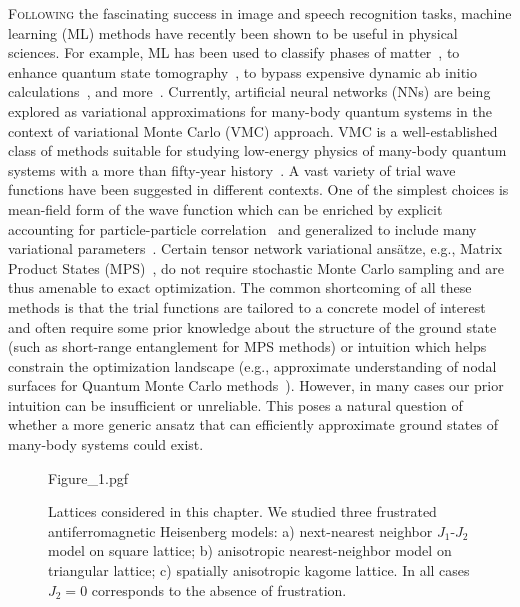\lettrine[lines=3]{F}{ollowing} the fascinating success in image and speech recognition tasks, machine learning (ML) methods have recently been shown to be useful in physical sciences. For example, ML has been used to classify phases of matter~\cite{carrasquilla2017machine}, to enhance quantum state tomography~\cite{torlai2018neural,sehayek2019learnability}, to bypass expensive dynamic ab initio calculations~\cite{brockherde2017bypassing}, and more~\cite{carleo2019machine}. Currently, artificial neural networks (NNs) are being explored as variational approximations for many-body quantum systems in the context of variational Monte Carlo (VMC) approach. VMC is a well-established class of methods suitable for studying low-energy physics of many-body quantum systems with a more than fifty-year history~\cite{McMillan}. A vast variety of trial wave functions have been suggested in different contexts. One of the simplest choices is mean-field form of the wave function which can be enriched by explicit accounting for particle-particle correlation~\cite{gros1988superconductivity,giamarchi1991phase,dev1992jastrow} and generalized to include many variational parameters~\cite{umrigar2005energy,schautz2004optimized,harju1997stochastic,capello2005variational}. Certain tensor network variational ans\"atze, e.g., Matrix Product States (MPS)~\cite{verstraete2006matrix}, do not require stochastic Monte Carlo sampling and are thus amenable to exact optimization. The common shortcoming of all these methods is that the trial functions are tailored to a concrete model of interest and often require some prior knowledge about the structure of the ground state (such as short-range entanglement for MPS methods) or intuition  which helps constrain the optimization landscape (e.g., approximate understanding of nodal surfaces for Quantum Monte Carlo methods~\cite{anderson1995fixed}). However, in many cases our prior intuition can be insufficient or unreliable. This poses a natural question of whether a more generic ansatz that can efficiently approximate ground states of many-body systems could exist.

\begin{figure*}[t]
    \centering
    {Figure_1.pgf}
    \caption{Lattices considered in this chapter. We studied three frustrated antiferromagnetic Heisenberg models: a) next-nearest neighbor $J_1$-$J_2$ model on square lattice; b) anisotropic nearest-neighbor model on triangular lattice; c) spatially anisotropic kagome lattice. In all cases $J_2=0$ corresponds to the absence of frustration.}
    \label{fig:nc20:models}
\end{figure*}

